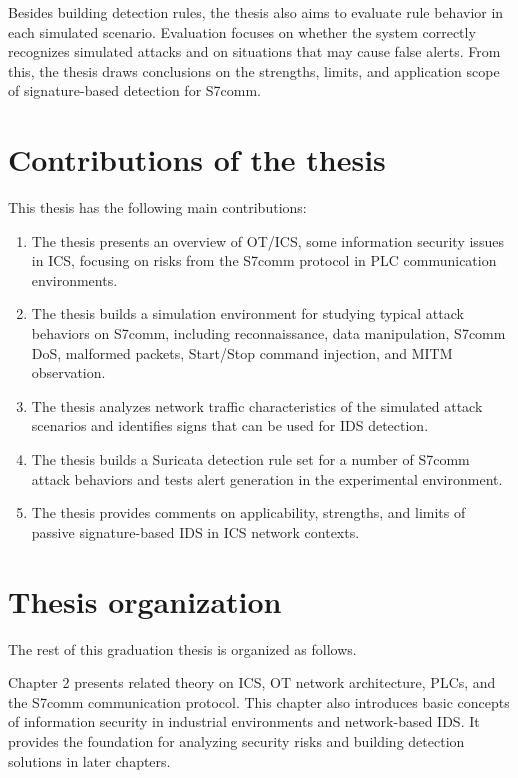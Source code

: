 \documentclass[../main.tex]{subfiles}
\begin{document}
Besides building detection rules, the thesis also aims to evaluate rule behavior in each simulated scenario. Evaluation focuses on whether the system correctly recognizes simulated attacks and on situations that may cause false alerts. From this, the thesis draws conclusions on the strengths, limits, and application scope of signature-based detection for S7comm.

\section{Contributions of the thesis}

This thesis has the following main contributions:

\begin{enumerate}
    \item The thesis presents an overview of OT/ICS, some information security issues in ICS, focusing on risks from the S7comm protocol in PLC communication environments.

    \item The thesis builds a simulation environment for studying typical attack behaviors on S7comm, including reconnaissance, data manipulation, S7comm DoS, malformed packets, Start/Stop command injection, and MITM observation.

    \item The thesis analyzes network traffic characteristics of the simulated attack scenarios and identifies signs that can be used for IDS detection.

    \item The thesis builds a Suricata detection rule set for a number of S7comm attack behaviors and tests alert generation in the experimental environment.

    \item The thesis provides comments on applicability, strengths, and limits of passive signature-based IDS in ICS network contexts.
\end{enumerate}

\section{Thesis organization}

The rest of this graduation thesis is organized as follows.

Chapter 2 presents related theory on ICS, OT network architecture, PLCs, and the S7comm communication protocol. This chapter also introduces basic concepts of information security in industrial environments and network-based IDS. It provides the foundation for analyzing security risks and building detection solutions in later chapters.
\end{document}
